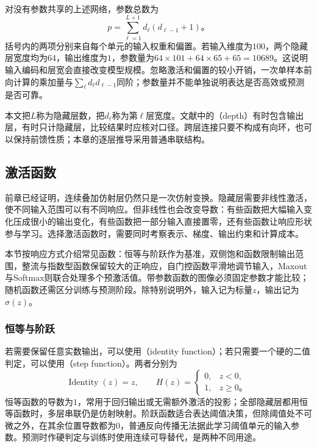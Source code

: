 对没有参数共享的上述网络，参数总数为
\begin{equation}
  p=\sum_{\ell=1}^{L+1}d_\ell(d_{\ell-1}+1)\text{。}
  \label{eq:ffn-parameter-count}
\end{equation}
括号内的两项分别来自每个单元的输入权重和偏置。若输入维度为$100$，两个隐藏层宽度均为$64$，输出维度为$1$，参数量为$64\times101+64\times65+65=10689$。这说明输入编码和层宽会直接改变模型规模。忽略激活和偏置的较小开销，一次单样本前向计算的乘加量与$\sum_\ell d_\ell d_{\ell-1}$同阶；参数量并不能单独说明表达是否高效或预测是否可靠。

本文把$L$称为隐藏层数，把$d_\ell$称为第$\ell$层宽度。文献中的（depth）有时包含输出层，有时只计隐藏层，比较结果时应核对口径。跨层连接只要不构成有向环，也可以保持前馈性质；本章的逐层推导采用普通串联结构。

\subsection{激活函数}
\label{sec:ffn-activations}

前章已经证明，连续叠加仿射层仍然只是一次仿射变换。隐藏层需要非线性激活，使不同输入范围可以有不同响应。但非线性也会改变导数：有些函数把大幅输入变化压成很小的输出变化，有些函数把一部分输入直接置零，还有些函数让响应形状参与学习。选择激活函数时，需要同时考察表示、梯度、输出约束和计算成本。

本节按响应方式介绍常见函数：恒等与阶跃作为基准，双侧饱和函数限制输出范围，整流与指数型函数保留较大的正响应，自门控函数平滑地调节输入，Maxout与Softmax则联合处理多个预激活值。带参数函数的图像必须固定参数才能比较；随机函数还需区分训练与预测阶段。除特别说明外，输入记为标量$z$，输出记为$\sigma(z)$。

\subsubsection{恒等与阶跃}
\label{sec:ffn-activation-baselines}

若需要保留任意实数输出，可以使用（identity function）；若只需要一个硬的二值判定，可以使用（step function）。两者分别为
\begin{equation}
  \operatorname{Identity}(z)=z,
  \qquad
  H(z)=\begin{cases}0,&z<0,\\1,&z\geq0\text{。}\end{cases}
  \label{eq:ffn-identity-step}
\end{equation}
恒等函数的导数为$1$，常用于回归输出或无需额外激活的投影；全部隐藏层都用恒等函数时，多层串联仍是仿射映射。阶跃函数适合表达阈值决策，但除阈值处不可微之外，在其余位置导数都为$0$，普通反向传播无法据此学习阈值单元的输入参数。预测时作硬判定与训练时使用连续可导替代，是两种不同用途。

